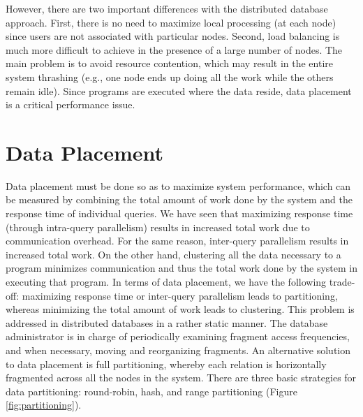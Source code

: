 \documentclass{vldb}
\begin{document}
However, there are two important differences with the distributed database approach. First, there is no need to maximize local processing (at each node) since users are not associated with particular nodes. Second, load balancing is much more difficult to achieve in the presence of a large number of nodes. The main problem is to avoid resource contention, which may result in the entire system thrashing (e.g., one node ends up doing all the work while the others remain idle). Since programs are executed where the data reside, data placement is a critical performance issue.

\section{Data Placement}

Data placement must be done so as to maximize system performance, which can be measured by combining the total amount of work done by the system and the response time of individual queries. We have seen that maximizing response time (through intra-query parallelism) results in increased total work due to communication overhead. For the same reason, inter-query parallelism results in increased total work. On the other hand, clustering all the data necessary to a program minimizes communication and thus the total work done by the system in executing that program. In terms of data placement, we have the following trade-off: maximizing response time or inter-query parallelism leads to partitioning, whereas minimizing the total amount of work leads to clustering. This problem is addressed in distributed databases in a rather static manner. The database administrator is in charge of periodically examining fragment access frequencies, and when necessary, moving and reorganizing fragments.
An alternative solution to data placement is full partitioning, whereby each relation is horizontally fragmented across all the nodes in the system. There are three basic strategies for data partitioning: round-robin, hash, and range partitioning (Figure \ref{fig:partitioning}).
\end{document}
